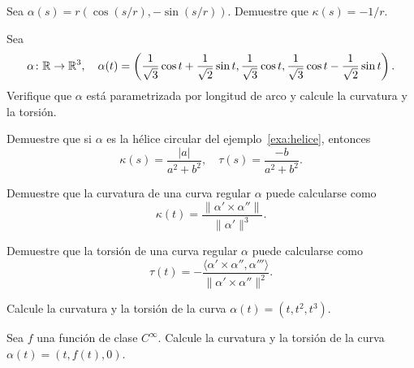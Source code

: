 \begin{exercise}
	\label{xca:circle}
	Sea $\alpha(s)=r(\cos(s/r),-\sin(s/r))$. Demuestre que 
	$\kappa(s)=-1/r$.
\end{exercise}

\begin{exercise}
	\label{xca:t=0}
	Sea 
	\[
		\alpha\colon\mathbb{R}\to\mathbb{R}^3,
		\quad
		\alpha(t)=\left(\frac{1}{\sqrt{3}}\cos t+\frac{1}{\sqrt{2}}\sin t,\frac{1}{\sqrt{3}}\cos t,\frac{1}{\sqrt{3}}\cos t-\frac{1}{\sqrt{2}}\sin t\right).
	\]
	Verifique que $\alpha$ está parametrizada por longitud de arco y calcule la
	curvatura y la torsión.	
\end{exercise}

\begin{exercise}
	\label{xca:helice}
	Demuestre que si $\alpha$ es la hélice circular del
	ejemplo~\ref{exa:helice}, entonces 
	\[
	\kappa(s)=\frac{|a|}{a^2+b^2},\quad
	\tau(s)=\frac{-b}{a^2+b^2}.
	\]
\end{exercise}

\begin{exercise}
	\label{xca:curvatura}
	Demuestre que la curvatura de una curva regular $\alpha$ puede calcularse
	como
	\[
		\kappa(t)=\frac{\|\alpha'\times\alpha''\|}{\|\alpha'\|^3}.
	\]
\end{exercise}

\begin{exercise}
	\label{xca:torsion}
	Demuestre que la torsión de una curva regular $\alpha$ 
	puede calcularse como
	\[
		\tau(t)=-\frac{\langle \alpha'\times\alpha'',\alpha'''\rangle}{\|\alpha'\times\alpha''\|^2}.
	\]
\end{exercise}

\begin{exercise}
	\label{xca:(t,t2,t3)}
	Calcule la curvatura y la torsión de la curva $\alpha(t)=(t,t^2,t^3)$. 
\end{exercise}

\begin{exercise}
	\label{xca:y=f(x)}
	Sea $f$ una función de clase $C^{\infty}$.  Calcule la curvatura y la
	torsión de la curva $\alpha(t)=(t,f(t),0)$. 
\end{exercise}


